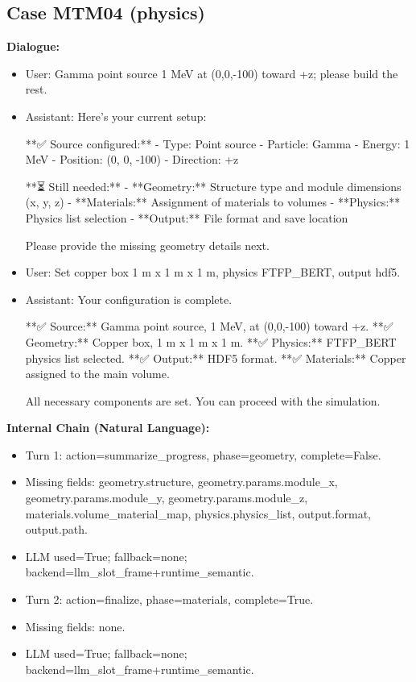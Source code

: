\documentclass[11pt]{ctexart}
\begin{document}
\subsection{Case MTM04 (physics)}
\textbf{Dialogue:}
\begin{itemize}
\item User: Gamma point source 1 MeV at (0,0,-100) toward +z; please build the rest.
\item Assistant: Here's your current setup:

**✅ Source configured:**
- Type: Point source
- Particle: Gamma
- Energy: 1 MeV
- Position: (0, 0, -100)
- Direction: +z

**⏳ Still needed:**
- **Geometry:** Structure type and module dimensions (x, y, z)
- **Materials:** Assignment of materials to volumes
- **Physics:** Physics list selection
- **Output:** File format and save location

Please provide the missing geometry details next.
\item User: Set copper box 1 m x 1 m x 1 m, physics FTFP\_BERT, output hdf5.
\item Assistant: Your configuration is complete.

**✅ Source:** Gamma point source, 1 MeV, at (0,0,-100) toward +z.
**✅ Geometry:** Copper box, 1 m x 1 m x 1 m.
**✅ Physics:** FTFP\_BERT physics list selected.
**✅ Output:** HDF5 format.
**✅ Materials:** Copper assigned to the main volume.

All necessary components are set. You can proceed with the simulation.
\end{itemize}
\textbf{Internal Chain (Natural Language):}
\begin{itemize}
\item Turn 1: action=summarize\_progress, phase=geometry, complete=False.
\item Missing fields: geometry.structure, geometry.params.module\_x, geometry.params.module\_y, geometry.params.module\_z, materials.volume\_material\_map, physics.physics\_list, output.format, output.path.
\item LLM used=True; fallback=none; backend=llm\_slot\_frame+runtime\_semantic.
\item Turn 2: action=finalize, phase=materials, complete=True.
\item Missing fields: none.
\item LLM used=True; fallback=none; backend=llm\_slot\_frame+runtime\_semantic.
\end{itemize}
\end{document}
